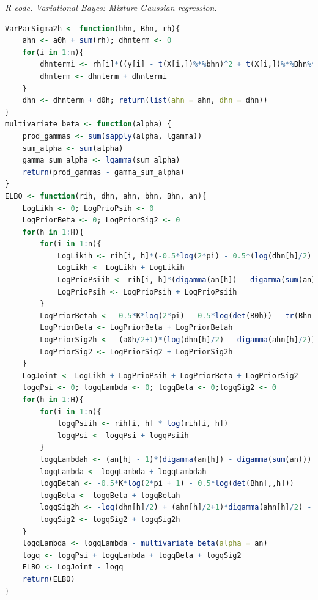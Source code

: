 \begin{enumerate}[leftmargin=*]
\begin{tcolorbox}[enhanced,width=4.67in,center upper,
	fontupper=\large\bfseries,drop shadow southwest,sharp corners]
	\textit{R code. Variational Bayes: Mixture Gaussian regression.}
	\begin{VF}
		\begin{lstlisting}[language=R]
VarParSigma2h <- function(bhn, Bhn, rh){
	ahn <- a0h + sum(rh); dhnterm <- 0
	for(i in 1:n){
		dhntermi <- rh[i]*((y[i] - t(X[i,])%*%bhn)^2 + t(X[i,])%*%Bhn%*%X[i,])
		dhnterm <- dhnterm + dhntermi
	}
	dhn <- dhnterm + d0h; return(list(ahn = ahn, dhn = dhn))
}
multivariate_beta <- function(alpha) {
	prod_gammas <- sum(sapply(alpha, lgamma))
	sum_alpha <- sum(alpha)
	gamma_sum_alpha <- lgamma(sum_alpha)
	return(prod_gammas - gamma_sum_alpha)
}
ELBO <- function(rih, dhn, ahn, bhn, Bhn, an){
	LogLikh <- 0; LogPrioPsih <- 0
	LogPriorBeta <- 0; LogPriorSig2 <- 0
	for(h in 1:H){
		for(i in 1:n){
			LogLikih <- rih[i, h]*(-0.5*log(2*pi) - 0.5*(log(dhn[h]/2) - digamma(ahn[h]/2)) - 0.5*(ahn[h]/dhn[h])*((y[i] - t(X[i,])%*%bhn[,h])^2 + t(X[i,])%*%Bhn[,,h]%*%X[i,]))
			LogLikh <- LogLikh + LogLikih
			LogPrioPsiih <- rih[i, h]*(digamma(an[h]) - digamma(sum(an)))
			LogPrioPsih <- LogPrioPsih + LogPrioPsiih
		}
		LogPriorBetah <- -0.5*K*log(2*pi) - 0.5*log(det(B0h)) - tr(Bhn[,,h]%*%B0hi) - t(bhn[,h] - b0h)%*%B0hi%*%(bhn[,h] - b0h)
		LogPriorBeta <- LogPriorBeta + LogPriorBetah
		LogPriorSig2h <- -(a0h/2+1)*(log(dhn[h]/2) - digamma(ahn[h]/2)) - 0.5*d0h*(ahn[h]/dhn[h]) + (a0h/2)*log(d0h/2) - lgamma(a0h/2)
		LogPriorSig2 <- LogPriorSig2 + LogPriorSig2h  
	}
	LogJoint <- LogLikh + LogPrioPsih + LogPriorBeta + LogPriorSig2
	logqPsi <- 0; logqLambda <- 0; logqBeta <- 0;logqSig2 <- 0
	for(h in 1:H){
		for(i in 1:n){
			logqPsiih <- rih[i, h] * log(rih[i, h])
			logqPsi <- logqPsi + logqPsiih
		}
		logqLambdah <- (an[h] - 1)*(digamma(an[h]) - digamma(sum(an)))
		logqLambda <- logqLambda + logqLambdah
		logqBetah <- -0.5*K*log(2*pi + 1) - 0.5*log(det(Bhn[,,h])) 
		logqBeta <- logqBeta + logqBetah
		logqSig2h <- -log(dhn[h]/2) + (ahn[h]/2+1)*digamma(ahn[h]/2) - ahn[h]/2 - lgamma(ahn[h]/2)
		logqSig2 <- logqSig2 + logqSig2h
	}
	logqLambda <- logqLambda - multivariate_beta(alpha = an)
	logq <- logqPsi + logqLambda + logqBeta + logqSig2
	ELBO <- LogJoint - logq
	return(ELBO)
}
\end{lstlisting}
	\end{VF}
\end{tcolorbox}


\end{enumerate}
